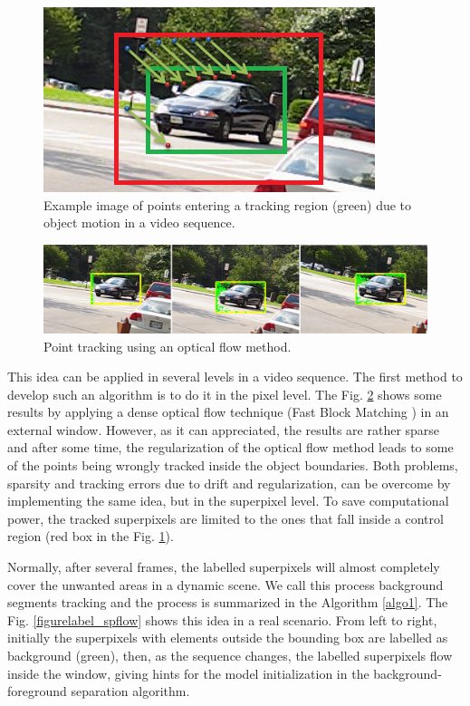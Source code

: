    \begin{figure}[thpb]
      \centering
      \includegraphics[height=0.285\textheight]{../images/tracking_points.png}
      \caption{Example image of points entering a tracking region (green) due to object motion in a video sequence.}
      \label{figurelabel_entering}
   \end{figure}
\setlength{\belowcaptionskip}{-10pt}

   \begin{figure}[thpb]
      \centering
      \includegraphics[width=1\textwidth]{../images/pointTr.png}
      \caption{Point tracking using an optical flow method.}
      \label{pointtr}
   \end{figure}


This idea can be applied in several levels in a video sequence. The first method to develop such an algorithm is to do it in the pixel level. The Fig. \ref{pointtr} shows some results by applying 
a dense optical flow technique (Fast Block Matching \cite{c50}) in an external window. However, as it can appreciated, the results are rather sparse and after some time, the regularization of the 
optical flow method leads to some of the points being wrongly tracked inside the object boundaries. Both problems, sparsity and tracking errors due to drift and regularization, can be 
overcome by implementing the same idea, but in the superpixel level.
To save computational power, the tracked superpixels are 
limited to the ones that fall inside a control region (red box in the Fig.  \ref{figurelabel_entering}). 

Normally, after several frames, 
the labelled superpixels will almost completely cover the unwanted areas in a dynamic scene. We call this process background segments tracking and the process is summarized in the 
Algorithm \ref{algo1}.  The Fig. \ref{figurelabel_spflow} shows this idea in a real scenario. From left to right, initially the superpixels with 
elements outside the bounding box are labelled as background (green), then, as the sequence changes, the labelled superpixels flow inside the window, giving hints for the model initialization in the background-foreground separation algorithm.

